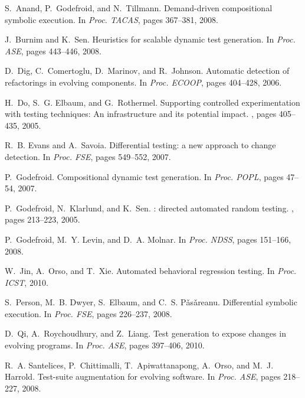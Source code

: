 \documentclass{llncs}
\begin{document}
\begin{thebibliography}{10}
\begin{scriptsize}


S.~Anand, P.~Godefroid, and N.~Tillmann.
\newblock Demand-driven compositional symbolic execution.
\newblock In {\em Proc. TACAS}, pages 367--381, 2008.

J.~Burnim and K.~Sen.
\newblock Heuristics for scalable dynamic test generation.
\newblock In {\em Proc. ASE}, pages 443--446, 2008.

D.~Dig, C.~Comertoglu, D.~Marinov, and R.~Johnson.
\newblock Automatic detection of refactorings in evolving components.
\newblock In {\em Proc. ECOOP}, pages 404--428, 2006.

H.~Do, S.~G. Elbaum, and G.~Rothermel.
\newblock Supporting controlled experimentation with testing techniques: An
  infrastructure and its potential impact.
, pages 405--435, 2005.

R.~B. Evans and A.~Savoia.
\newblock Differential testing: a new approach to change detection.
\newblock In {\em Proc. FSE}, pages 549--552, 2007.

P.~Godefroid.
\newblock Compositional dynamic test generation.
\newblock In {\em Proc. POPL}, pages 47--54, 2007.

P.~Godefroid, N.~Klarlund, and K.~Sen.
: directed automated random testing.
, pages 213--223, 2005.

P.~Godefroid, M.~Y. Levin, and D.~A. Molnar.
\newblock In {\em Proc. NDSS}, pages 151--166, 2008.

W.~Jin, A.~Orso, and T.~Xie.
\newblock Automated behavioral regression testing.
\newblock In {\em Proc. ICST}, 2010.

S.~Person, M.~B. Dwyer, S.~Elbaum, and C.~S. P\v{a}s\v{a}reanu.
\newblock Differential symbolic execution.
\newblock In {\em Proc. FSE}, pages 226--237, 2008.

D.~Qi, A.~Roychoudhury, and Z.~Liang.
\newblock Test generation to expose changes in evolving programs.
\newblock In {\em Proc. ASE}, pages 397--406, 2010.

R.~A. Santelices, P.~Chittimalli, T.~Apiwattanapong, A.~Orso, and M.~J.
  Harrold.
\newblock Test-suite augmentation for evolving software.
\newblock In {\em Proc. ASE}, pages 218--227, 2008.


\end{scriptsize}
\end{thebibliography}
\end{document}
